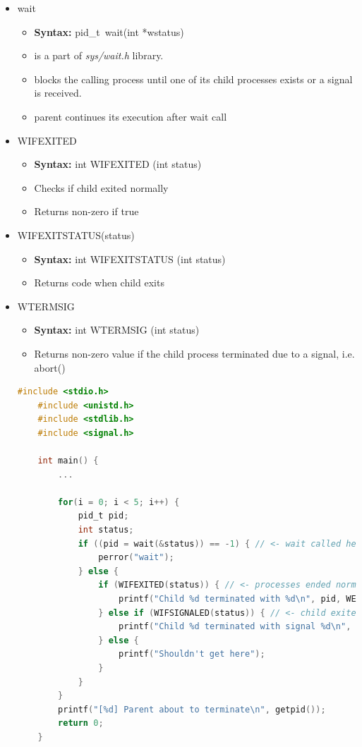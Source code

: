 \documentclass[12pt]{article}
\begin{document}
\begin{itemize}
    \item wait
    \begin{itemize}
        \item \textbf{Syntax:} pid\_t\ wait(int *wstatus)
        \item is a part of \textit{sys/wait.h} library.
        \item blocks the calling process until one of its child processes exists
        or a signal is received.
        \item parent continues its execution after wait call
    \end{itemize}
    \item WIFEXITED
    \begin{itemize}
        \item \textbf{Syntax:} int WIFEXITED (int status)
        \item Checks if child exited normally
        \item Returns non-zero if true
    \end{itemize}
    \item WIFEXITSTATUS(status)
    \begin{itemize}
        \item \textbf{Syntax:} int WIFEXITSTATUS (int status)
        \item Returns code when child exits
    \end{itemize}
    \item WTERMSIG
    \begin{itemize}
        \item \textbf{Syntax:} int WTERMSIG (int status)
        \item Returns non-zero value if the child process terminated due to a signal,
        i.e. abort()
    \end{itemize}

    \begin{lstlisting}[language=c,caption={process\_example\_3.c}]
    #include <stdio.h>
    #include <unistd.h>
    #include <stdlib.h>
    #include <signal.h>

    int main() {
        ...

        for(i = 0; i < 5; i++) {
            pid_t pid;
            int status;
            if ((pid = wait(&status)) == -1) { // <- wait called here
                perror("wait");
            } else {
                if (WIFEXITED(status)) { // <- processes ended normally
                    printf("Child %d terminated with %d\n", pid, WEXITSTATUS(status));
                } else if (WIFSIGNALED(status)) { // <- child exited due to signal
                    printf("Child %d terminated with signal %d\n", pid, WTERMSIG(status));
                } else {
                    printf("Shouldn't get here");
                }
            }
        }
        printf("[%d] Parent about to terminate\n", getpid());
        return 0;
    }
    \end{lstlisting}
\end{itemize}
\end{document}
